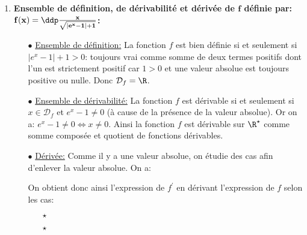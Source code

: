 \begin{correction}
\begin{enumerate}
\begin{itemize}
 \end{itemize}
\item  \textbf{Ensemble de d\'efinition, de d\'erivabilit\'e et d\'eriv\'ee de $\mathbf{f}$ d\'efinie par: $\mathbf{f(x)=\ddp\frac{x}{\sqrt{|e^x-1|+1}}}$:}
\begin{itemize}
\item[$\bullet$] \underline{Ensemble de d\'efinition:} La fonction $f$ est bien d\'efinie si et seulement si $|e^x-1|+1>0$: toujours vrai comme somme de deux termes positifs dont l'un est strictement positif car $1>0$ et une valeur absolue est toujours positive ou nulle. Donc $\mathcal{D}_f=\R$.
\item[$\bullet$] \underline{Ensemble de d\'erivabilit\'e:} La fonction $f$ est d\'erivable si et seulement si $x\in\mathcal{D}_f$ et $e^x-1\not= 0$ (\`{a} cause de la pr\'esence de la valeur absolue). Or on a: $e^x-1\not=0\Leftrightarrow x\not= 0$. Ainsi la fonction $f$ est d\'erivable sur $\R^{\star}$ comme somme compos\'ee et quotient de fonctions d\'erivables.
\item[$\bullet$] \underline{D\'eriv\'ee:} Comme il y a une valeur absolue, on \'etudie des cas afin d'enlever la valeur absolue. 
On a:
\begin{center}
\end{center}
On obtient donc ainsi l'expression de $f^{\prime}$ en d\'erivant l'expression de $f$ selon les cas:
\begin{itemize}
\item[$\star$] 
\item[$\star$] 
\end{itemize}

 \end{itemize}
\end{enumerate}
\end{correction}





